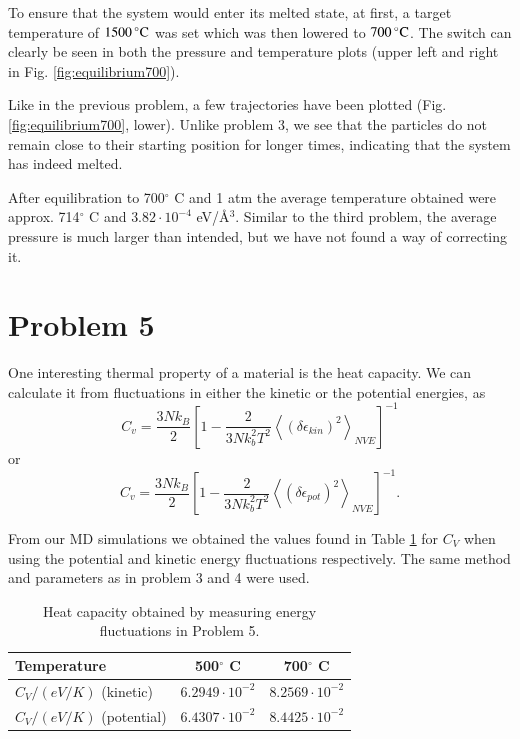 To ensure that the system would enter its melted state, at first, a target temperature of $\unit[1500]{^\circ C}$ was set which was then lowered to $\unit[700]{^\circ C}$. The switch can clearly be seen in both the pressure and temperature plots (upper left and right in Fig. \ref{fig:equilibrium700}).

Like in the previous problem, a few trajectories have been plotted (Fig. \ref{fig:equilibrium700}, lower). Unlike problem 3, we see that the particles do not remain close to their starting position for longer times, indicating that the system has indeed melted.

After equilibration to 700$^\circ$ C and 1 atm the average temperature obtained were approx. 714$^\circ$ C and $3.82 \cdot 10^{-4}$ eV/\r{A}$^3$. Similar to the third problem, the average pressure is much larger than intended, but we have not found a way of correcting it.

\section*{Problem 5}

\noindent One interesting thermal property of a material is the heat capacity. We can calculate it from fluctuations in either the kinetic or the potential energies, as
\begin{equation}
C_v=\frac{3Nk_B}{2}\left[1-\frac{2}{3Nk_b^2T^2}\left\langle \left(\delta \epsilon_{kin}\right)^2  \right\rangle_{NVE} \right]^{-1}
\label{eq:prob5-1}
\end{equation}
or
\begin{equation}
C_v=\frac{3Nk_B}{2}\left[1-\frac{2}{3Nk_b^2T^2}\left\langle \left(\delta \epsilon_{pot}\right)^2  \right\rangle_{NVE} \right]^{-1}.
\label{eq:prob5-2}
\end{equation}

From our MD simulations we obtained the values found in {Table \ref{tab:prob5}} for $C_V$ when using the potential and kinetic energy fluctuations respectively. The same method and parameters as in problem 3 and 4 were used.

\begin{table}[H]
	\centering
	\caption{Heat capacity obtained by measuring energy fluctuations in Problem 5.}
	\begin{tabular}{l|cc}
		\hline \textbf{Temperature} & \textbf{500$^\circ$ C} & \textbf{700$^\circ$ C} \\ \hline
		$C_V / (\unit{eV/K})$ (kinetic) & $ 6.2949 \cdot 10^{-2}$ & $ 8.2569 \cdot 10^{-2}$ \\
		$C_V / (\unit{eV/K})$ (potential) & $ 6.4307 \cdot 10^{-2}$ & $ 8.4425 \cdot 10^{-2}$ \\ \hline
	\end{tabular}
	\label{tab:prob5}
\end{table}


